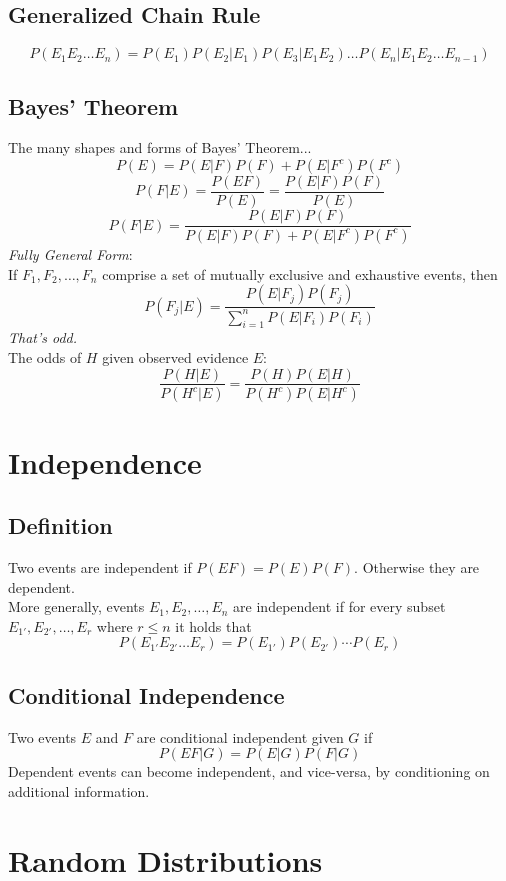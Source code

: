 \documentclass[12pt]{article}
\begin{document}
\subsection{Generalized Chain Rule}
\[
    P(E_1 E_2 \ldots E_n) = P(E_1)P(E_2|E_1)P(E_3|E_1 E_2)\ldots P(E_n|E_1 E_2 \ldots E_{n-1})
\]
\subsection{Bayes' Theorem}
The many shapes and forms of Bayes' Theorem...
\[
    P(E) = P(E|F)P(F) + P(E|F^c)P(F^c)
\]
\[
    P(F|E) = \frac{P(EF)}{P(E)} = \frac{P(E|F)P(F)}{P(E)}
\]
\[
    P(F|E) = \frac{P(E|F)P(F)}{P(E|F)P(F) + P(E|F^c)P(F^c)}
\]
\emph{Fully General Form}:\\
If $F_1, F_2, \ldots, F_n$ comprise a set of mutually exclusive and exhaustive events, then
\[
    P(F_j|E) = \frac{P(E|F_j)P(F_j)}{\sum_{i=1}^n P(E|F_i)P(F_i)}
\]
\emph{That's odd.} \\
The odds of $H$ given observed evidence $E$:
\[
    \frac{P(H|E)}{P(H^c|E)} = \frac{P(H)P(E|H)}{P(H^c)P(E|H^c)}
\]

\section{Independence}
\subsection{Definition}
Two events are independent if $P(EF) = P(E)P(F)$. Otherwise they are dependent. \\
More generally, events $E_1, E_2, \ldots, E_n$ are independent if for every subset $E_{1'}, E_{2'}, \ldots, E_r$ where $r \leq n$ it holds that
\[
    P(E_{1'} E_{2'} \ldots E_r) = P(E_{1'})P(E_{2'})\cdots P(E_r)
\]
\subsection{Conditional Independence}
Two events $E$ and $F$ are conditional independent given $G$ if 
\[
    P(EF|G) = P(E|G)P(F|G)
\]
Dependent events can become independent, and vice-versa, by conditioning on additional information.

\section{Random Distributions}
\end{document}
